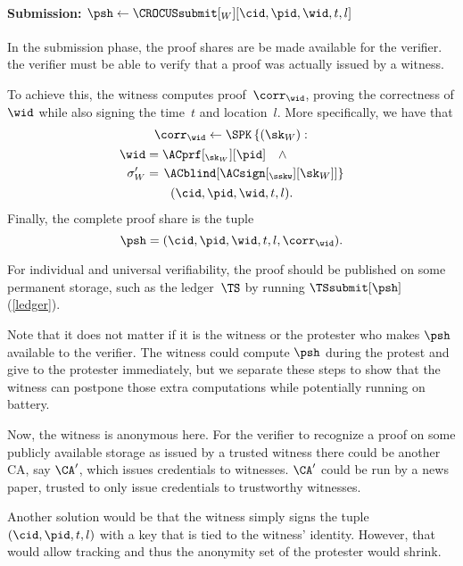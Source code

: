 \paragraph*{Submission:
  \(\psh\gets \CROCUSsubmit[_W][\cid, \pid, \wid, t, l]\)}

In the submission phase, the proof shares are be made available for the 
verifier.
\Ie the verifier must be able to verify that a proof was actually issued by a 
witness.

To achieve this, the witness computes  proof~\(\corr_{\wid}\), 
proving the correctness of \(\wid\) while also signing the time~\(t\) and 
location~\(l\).
More specifically, we have that
\begin{multline*}
  \corr_{\wid}\gets \SPK\left\{ (\sk_W) : \right. \\
    \begin{aligned}
      \wid &= \ACprf[_{\sk_W}][\pid] \quad \land \\
      \sigma_W' &= \left. \ACblind[\ACsign[_{\sskw}][\sk_W]] \right\}
    \end{aligned} \\
      (\cid, \pid, \wid, t, l).
\end{multline*}
Finally, the complete proof share is the tuple \[
  \psh = (\cid, \pid, \wid, t, l, \corr_{\wid}).
\]

For individual and universal verifiability, the proof should be published on 
some permanent storage, such as the ledger~\(\TS\) by running 
\(\TSsubmit[\psh]\) (\cref{ledger}).

Note that it does not matter if it is the witness or the protester who makes 
\(\psh\) available to the verifier.
The witness could compute \(\psh\) during the protest and give to the 
protester immediately, but we separate these steps to show that the witness can 
postpone those extra computations while potentially running on battery.

Now, the witness is anonymous here.
For the verifier to recognize a proof on some publicly available storage as 
issued by a trusted witness there could be another \ac{CA}, say \(\CA'\), which 
issues credentials to witnesses.
\(\CA'\) could be run by a news paper, trusted to only issue credentials to 
trustworthy witnesses.

Another solution would be that the witness simply signs the tuple \((\cid, 
\pid, t, l)\) with a key that is tied to the witness' identity.
However, that would allow tracking and thus the anonymity set of the protester 
would shrink.

